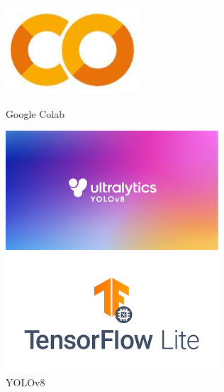 \begin{figure}[ht!]
	\centering
	\begin{minipage}{0.20\linewidth}
		\centering
		\includegraphics[width=\linewidth]{figs/googlecolab.png}
		\caption*{\centering Google Colab} %
	\end{minipage}
	\hspace{1cm}
	\begin{minipage}{0.25\linewidth}
		\centering
		\includegraphics[width=\linewidth]{figs/yolov8.png}
		\caption*{\centering YOLOv8} %
	\end{minipage}
	\hspace{1cm}
	\begin{minipage}{0.25\linewidth}
		\centering
		\includegraphics[width=\linewidth]{figs/tflite.png}

\end{minipage}
\end{figure}
